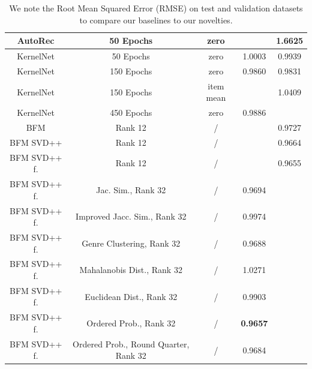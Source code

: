 \documentclass[10pt,conference,compsocconf]{IEEEtran}
\begin{document}
\begin{table}
{\begin{tabular}{|| c | c | c | c | c ||}
            AutoRec              & 50 Epochs                             & zero                    &                        & 1.6625                  \\
            \hline
            KernelNet            & 50 Epochs                             & zero                    & 1.0003                 & 0.9939                  \\
            KernelNet            & 150 Epochs                            & zero                    & 0.9860                 & 0.9831                  \\
            KernelNet            & 150 Epochs                            & item mean               &                        & 1.0409                  \\
            KernelNet            & 450 Epochs                            & zero                    & 0.9886                 &                         \\
            \hline
            BFM                  & Rank 12                               & /                       &                        & 0.9727                  \\
            BFM SVD++            & Rank 12                               & /                       &                        & 0.9664                  \\
            BFM SVD++ f.         & Rank 12                               & /                       &                        & 0.9655                  \\
            BFM SVD++ f.         & Jac. Sim., Rank 32                    & /                       & 0.9694                 &                         \\
            BFM SVD++ f.         & Improved Jacc. Sim., Rank 32          & /                       & 0.9974                 &                         \\
            BFM SVD++ f.         & Genre Clustering, Rank 32             & /                       & 0.9688                 &                         \\
            BFM SVD++ f.         & Mahalanobis Dist., Rank 32            & /                       & 1.0271                 &                         \\
            BFM SVD++ f.         & Euclidean Dist., Rank 32              & /                       & 0.9903                 &                         \\
            BFM SVD++ f.         & Ordered Prob., Rank 32                & /                       & \textbf{ 0.9657 }      &                         \\
            BFM SVD++ f.         & Ordered Prob., Round Quarter, Rank 32 & /                       & 0.9684                 &                         \\
            \hline
        \end{tabular}
        }
        \caption{We note the Root Mean Squared Error (RMSE) on test and validation datasets to compare our baselines to our novelties.}
        \label{tab:ablation}
    \end{table}
\end{document}
